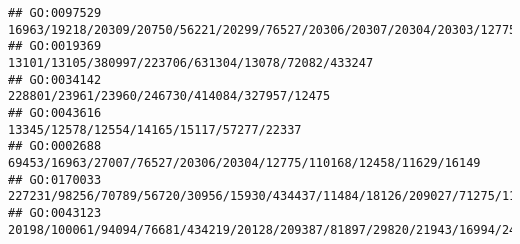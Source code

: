 \documentclass[
]{article}
\begin{document}
\begin{verbatim}
## GO:0097529                                                                                                                                                                                                                                                                                                             16963/19218/20309/20750/56221/20299/76527/20306/20307/20304/20303/12775/21943/245195/11629/16149
## GO:0019369                                                                                                                                                                                                                                                                                                                                                          13101/13105/380997/223706/631304/13078/72082/433247
## GO:0034142                                                                                                                                                                                                                                                                                                                                                                228801/23961/23960/246730/414084/327957/12475
## GO:0043616                                                                                                                                                                                                                                                                                                                                                                    13345/12578/12554/14165/15117/57277/22337
## GO:0002688                                                                                                                                                                                                                                                                                                                                           69453/16963/27007/76527/20306/20304/12775/110168/12458/11629/16149
## GO:0170033                                                                                                                                                                                                                                                                                                                             227231/98256/70789/56720/30956/15930/434437/11484/18126/209027/71275/11720/17986
## GO:0043123                                                                                                                                                                                                                                                                                                                             20198/100061/94094/76681/434219/20128/209387/81897/29820/21943/16994/24108/16149

\end{verbatim}
\end{document}
